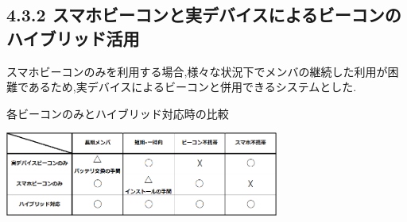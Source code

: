 \subsection*{4.3.2 スマホビーコンと実デバイスによるビーコンのハイブリッド活用}
スマホビーコンのみを利用する場合,様々な状況下でメンバの継続した利用が困難であるため,実デバイスによるビーコンと併用できるシステムとした.




\begin{table}[tbh]
  \centering
  \caption{各ビーコンのみとハイブリッド対応時の比較}
  \includegraphics[width=9cm]{image/table.png}
  \label{multipleBPM}
\end{table}